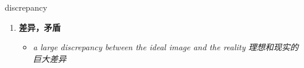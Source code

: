 
\begin{frame}
{\huge discrepancy}
\begin{center}
\begin{enumerate}\Large
  \item \textbf{差异，矛盾}
  \begin{itemize}
    \item \em{\Large{a large discrepancy between the ideal image and the reality 理想和现实的巨大差异}}
  \end{itemize}
\end{enumerate}
\end{center}
\end{frame}
